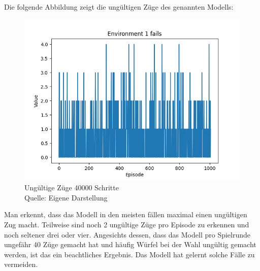 Die folgende Abbildung zeigt die ungültigen Züge des genannten Modells:
\nopagebreak
\begin{figure}[H]
	\includegraphics[width=1\textwidth]{Bilder/maskableppo_ganzschoenclever_193avg_v3.1f} 
	\caption[Ungültige Züge 40000 Schritte]{Ungültige Züge 40000 Schritte\\ Quelle: Eigene Darstellung}
\end{figure}

Man erkennt, dass das Modell in den meisten fällen maximal einen ungültigen Zug macht. Teilweise sind noch 2 ungültige Züge pro Episode zu erkennen und noch seltener drei oder vier. Angesichts dessen, dass das Modell pro Spielrunde ungefähr 40 Züge gemacht hat und häufig Würfel bei der Wahl ungültig gemacht werden, ist das ein beachtliches Ergebnis. Das Modell hat gelernt solche Fälle zu vermeiden.\\

